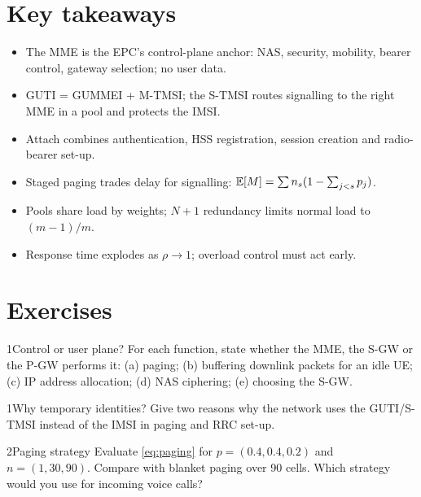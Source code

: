 \documentclass[11pt,a4paper]{article}
\begin{document}
\section{Key takeaways}
\begin{takeawaybox}
\begin{itemize}
  \item The MME is the EPC's control-plane anchor: NAS, security, mobility, bearer control, gateway
        selection; no user data.
  \item GUTI = GUMMEI + M-TMSI; the S-TMSI routes signalling to the right MME in a pool and protects the IMSI.
  \item Attach combines authentication, HSS registration, session creation and radio-bearer set-up.
  \item Staged paging trades delay for signalling: $\mathbb{E}[M] = \sum n_s(1-\sum_{j<s}p_j)$.
  \item Pools share load by weights; $N+1$ redundancy limits normal load to $(m-1)/m$.
  \item Response time explodes as $\rho\to1$; overload control must act early.
\end{itemize}
\end{takeawaybox}

\section{Exercises}

\begin{exercisebox}{1}{Control or user plane?}\label{exr:split}
For each function, state whether the MME, the S-GW or the P-GW performs it: (a) paging; (b) buffering
downlink packets for an idle UE; (c) IP address allocation; (d) NAS ciphering; (e) choosing the S-GW.
\end{exercisebox}

\begin{exercisebox}{1}{Why temporary identities?}\label{exr:guti}
Give two reasons why the network uses the GUTI/S-TMSI instead of the IMSI in paging and RRC set-up.
\end{exercisebox}

\begin{exercisebox}{2}{Paging strategy}\label{exr:paging}
Evaluate \cref{eq:paging} for $p = (0.4, 0.4, 0.2)$ and $n = (1, 30, 90)$. Compare with blanket paging over 90
cells. Which strategy would you use for incoming voice calls?
\end{exercisebox}
\end{document}
